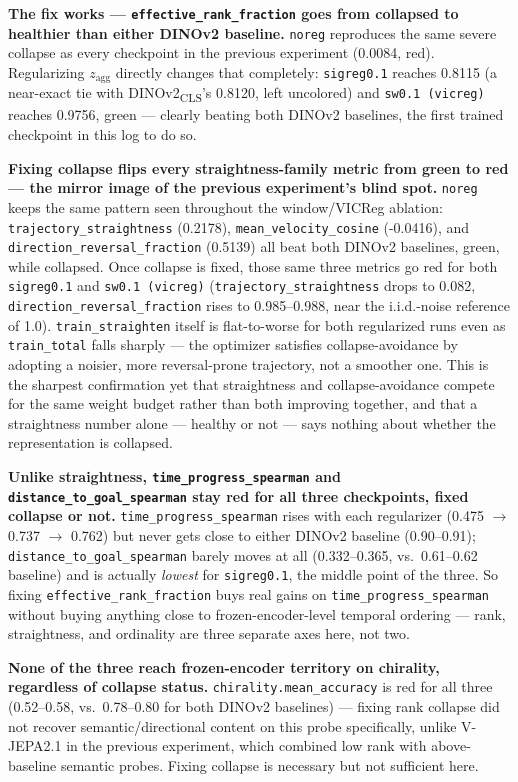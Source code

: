 \textbf{The fix works --- \texttt{effective\_rank\_fraction} goes from collapsed to
healthier than either DINOv2 baseline.} \texttt{noreg} reproduces the same severe
collapse as every checkpoint in the previous experiment (0.0084, red). Regularizing
$z_{\mathrm{agg}}$ directly changes that completely: \texttt{sigreg0.1} reaches 0.8115
(a near-exact tie with DINOv2\textsubscript{CLS}'s 0.8120, left uncolored) and
\texttt{sw0.1 (vicreg)} reaches 0.9756, green --- clearly beating both DINOv2 baselines,
the first trained checkpoint in this log to do so.

\textbf{Fixing collapse flips every straightness-family metric from green to red ---
the mirror image of the previous experiment's blind spot.} \texttt{noreg} keeps the same
pattern seen throughout the window/VICReg ablation: \texttt{trajectory\_straightness}
(0.2178), \texttt{mean\_velocity\_cosine} (-0.0416), and \texttt{direction\_reversal\_fraction}
(0.5139) all beat both DINOv2 baselines, green, while collapsed. Once collapse is fixed,
those same three metrics go red for both \texttt{sigreg0.1} and \texttt{sw0.1 (vicreg)}
(\texttt{trajectory\_straightness} drops to 0.082, \texttt{direction\_reversal\_fraction}
rises to 0.985--0.988, near the i.i.d.-noise reference of 1.0). \texttt{train\_straighten}
itself is flat-to-worse for both regularized runs even as \texttt{train\_total} falls
sharply --- the optimizer satisfies collapse-avoidance by adopting a noisier, more
reversal-prone trajectory, not a smoother one. This is the sharpest confirmation yet that
straightness and collapse-avoidance compete for the same weight budget rather than both
improving together, and that a straightness number alone --- healthy or not --- says
nothing about whether the representation is collapsed.

\textbf{Unlike straightness, \texttt{time\_progress\_spearman} and
\texttt{distance\_to\_goal\_spearman} stay red for all three checkpoints, fixed collapse
or not.} \texttt{time\_progress\_spearman} rises with each regularizer (0.475 $\to$
0.737 $\to$ 0.762) but never gets close to either DINOv2 baseline (0.90--0.91);
\texttt{distance\_to\_goal\_spearman} barely moves at all (0.332--0.365, vs.\ 0.61--0.62
baseline) and is actually \emph{lowest} for \texttt{sigreg0.1}, the middle point of the
three. So fixing \texttt{effective\_rank\_fraction} buys real gains on
\texttt{time\_progress\_spearman} without buying anything close to frozen-encoder-level
temporal ordering --- rank, straightness, and ordinality are three separate axes here,
not two.

\textbf{None of the three reach frozen-encoder territory on chirality, regardless of
collapse status.} \texttt{chirality.mean\_accuracy} is red for all three (0.52--0.58,
vs.\ 0.78--0.80 for both DINOv2 baselines) --- fixing rank collapse did not recover
semantic/directional content on this probe specifically, unlike V-JEPA2.1 in the
previous experiment, which combined low rank with above-baseline semantic probes. Fixing
collapse is necessary but not sufficient here.
